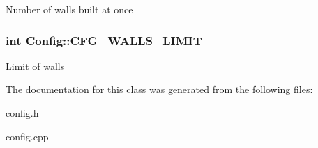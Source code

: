 Number of walls built at once \hypertarget{class_config_a65e8649896c94b7c3e8f094be03c9b76}{
\subsubsection[{C\-F\-G\-\_\-\-W\-A\-L\-L\-S\-\_\-\-L\-I\-M\-I\-T}]{\setlength{\rightskip}{0pt plus 5cm}int Config\-::\-C\-F\-G\-\_\-\-W\-A\-L\-L\-S\-\_\-\-L\-I\-M\-I\-T}}\label{class_config_a65e8649896c94b7c3e8f094be03c9b76}
Limit of walls 

The documentation for this class was generated from the following files\-:\begin{DoxyCompactItemize}
\item 
config.\-h\item 
config.\-cpp\end{DoxyCompactItemize}
